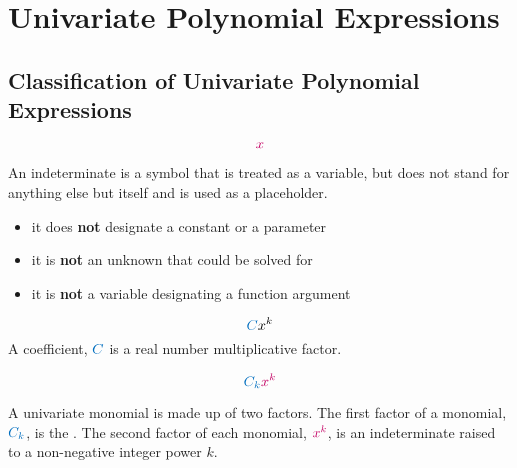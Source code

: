 \documentclass[20150903-160354-rs2.2-MarksMathNotebook.tex]{subfiles}
\begin{document}
%
%


\chapter{Univariate Polynomial Expressions}

\section{Classification of Univariate Polynomial Expressions}

\begin{definition}[Indeterminate]

\[
\cRed{x}
\]

An indeterminate is a symbol that is treated as a variable, but does not stand for anything else but itself and is used as a placeholder.

\begin{itemize}
	\item it does \textbf{not} designate a constant or a parameter
	\item it is \textbf{not} an unknown that could be solved for
	\item it is \textbf{not} a variable designating a function argument
\end{itemize}

\hfill \cite{wikipediate:indeterminate}
\end{definition}


\begin{definition}[Coefficient]
\[
	\cBlue{C}x^{k}
\]
A coefficient, $\cBlue{C}$ is a real number multiplicative factor.\\

\end{definition}

\begin{definition}

\[
 \cBlue{C_{k}}\cRed{x^{k}}
\]

A univariate monomial is made up of two factors.  The first factor of a monomial, $\cBlue{C_{k}}$, is the . The second factor of each monomial, $\cRed{x^{k}}$, is an indeterminate raised to a non-negative integer power $k$. \\

\end{definition}
\end{document}
